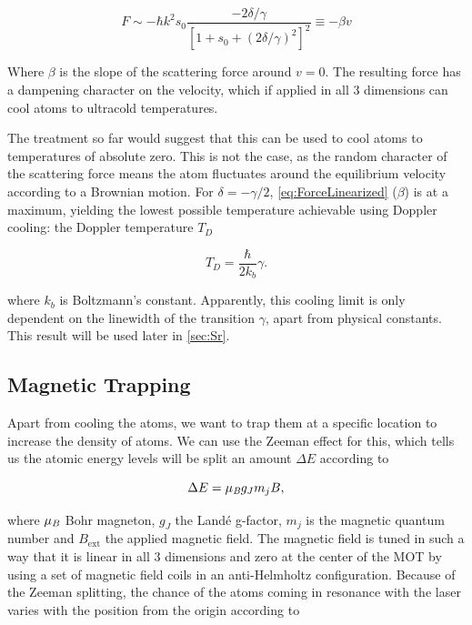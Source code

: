 \begin{equation}\label{eq:ForceLinearized}
	F \sim - \hbar k^2 s_0 \frac{-2\delta/\gamma}{\left[1+s_0+(2\delta/\gamma)^2\right]^2} \equiv -\beta v
\end{equation}

Where $\beta$ is the slope of the scattering force around $v=0$. The resulting force has a dampening character on the velocity, which if applied in all 3 dimensions can cool atoms to ultracold temperatures. 

The treatment so far would suggest that this can be used to cool atoms to temperatures of absolute zero. This is not the case, as the random character of the scattering force means the atom fluctuates around the equilibrium velocity according to a Brownian motion. 
For $\delta=-\gamma/2$, \cref{eq:ForceLinearized} ($\beta$) is at a maximum, yielding the lowest possible temperature achievable using Doppler cooling: the Doppler temperature $T_D$ \cite{Metcalf1999}

\begin{equation}\label{eq:DopplerTemperature}
	T_D = \frac{\hbar}{2k_b} \gamma.
\end{equation}

where $k_b$ is Boltzmann's constant. Apparently, this cooling limit is only dependent on the linewidth of the transition $\gamma$, apart from physical constants. This result will be used later in \cref{sec:Sr}.

\subsection{Magnetic Trapping}

Apart from cooling the atoms, we want to trap them at a specific location to increase the density of atoms. We can use the Zeeman effect for this, which tells us the atomic energy levels will be split an amount $\Delta E$ according to \cite{Griffiths2004}

\begin{equation}\label{eq:Zeeman}
	\Delta E = \mu_{\emph{B}} g_J m_j B,
\end{equation}

where $\mu_{\emph{B}}$ Bohr magneton, $g_J$ the Landé g-factor, $m_j$ is the magnetic quantum number and $B_{\text{ext}}$ the applied magnetic field. The magnetic field is tuned in such a way that it is linear in all 3 dimensions and zero at the center of the \ac{MOT} by using a set of magnetic field coils in an anti-Helmholtz configuration. Because of the Zeeman splitting, the chance of the atoms coming in resonance with the laser varies with the position from the origin according to \cite{Kowalski2010}

